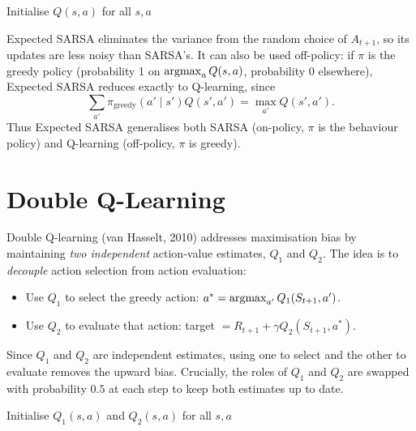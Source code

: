 \begin{algorithm}[ht]
\caption{Expected SARSA}
\label{alg:expected-sarsa}
Initialise $Q(s,a)$ for all $s,a$\;
\end{algorithm}

Expected SARSA eliminates the variance from the random choice of $A_{t+1}$, so its updates are less noisy than SARSA's.  It can also be used off-policy: if $\pi$ is the greedy policy (probability 1 on $\operatorname*{argmax}_a Q(s,a)$, probability 0 elsewhere), Expected SARSA reduces exactly to Q-learning, since
\[
\sum_{a'}\pi_{\mathrm{greedy}}(a'\mid s')Q(s',a') = \max_{a'}Q(s',a').
\]
Thus Expected SARSA generalises both SARSA (on-policy, $\pi$ is the behaviour policy) and Q-learning (off-policy, $\pi$ is greedy).

\section{Double Q-Learning}
\label{sec:double-q}

Double Q-learning (van Hasselt, 2010) addresses maximisation bias by maintaining \emph{two independent} action-value estimates, $Q_1$ and $Q_2$.  The idea is to \emph{decouple} action selection from action evaluation:
\begin{itemize}[leftmargin=*]
  \item Use $Q_1$ to select the greedy action: $a^* = \operatorname*{argmax}_{a'} Q_1(S_{t+1},a')$.
  \item Use $Q_2$ to evaluate that action: target $= R_{t+1} + \gamma Q_2(S_{t+1},a^*)$.
\end{itemize}
Since $Q_1$ and $Q_2$ are independent estimates, using one to select and the other to evaluate removes the upward bias.  Crucially, the roles of $Q_1$ and $Q_2$ are swapped with probability $0.5$ at each step to keep both estimates up to date.

\begin{algorithm}[ht]
\caption{Double Q-Learning}
\label{alg:double-q}
Initialise $Q_1(s,a)$ and $Q_2(s,a)$ for all $s,a$\;
\end{algorithm}

